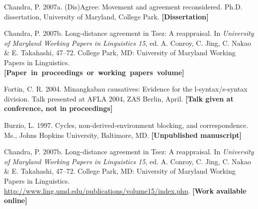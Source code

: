 \documentclass[letterpaper,12pt, twoside]{article}
\begin{document}
\begin{list}{}{\leftmargin  0.25in
               \itemindent -0.25in \itemsep 0pt \parsep 0pt }
\item
Chandra, P. 2007a. (Dis)Agree: Movement and agreement reconsidered. Ph.D. dissertation, University of Maryland, College Park. {\footnotesize\bfseries \hfill [Dissertation]}

\item
Chandra, P. 2007b. Long-distance agreement in Tsez: A reappraisal. In \emph{University of 
Maryland Working Papers in Linguistics 15}, ed. A. Conroy, C. Jing, C. Nakao \& E. 
Takahashi, 47--72. College Park, MD: University of Maryland Working Papers in Linguistics. \\
  {\footnotesize\bfseries \hspace*{238pt} \hbox{[Paper in proceedings or working papers volume]}}

\item
Fortin, C. R. 2004. Minangkabau causatives: Evidence for the l-syntax/s-syntax division. Talk presented at AFLA 2004, ZAS Berlin, April.  {\footnotesize\bfseries \hfill [Talk given at conference, not in proceedings]}

\item
Burzio, L. 1997. Cycles, non-derived-environment blocking, and correspondence. Ms., Johns Hopkins University, Baltimore, MD.  {\footnotesize\bfseries \hfill [Unpublished manuscript]}

\item
Chandra, P. 2007b. Long-distance agreement in Tsez: A reappraisal. In \emph{University of 
Maryland \linebreak[4]Working Papers in Linguistics 15}, ed. A. Conroy, C. Jing, C. Nakao \& E. 
Takahashi, 47--72. College Park, MD: University of Maryland Working Papers in Linguistics. \href{http://www.ling.umd.edu/publications/volume15/index.php}{http://www.ling.\linebreak[4]umd.edu/publications/volume15/index.php}.
  {\footnotesize\bfseries \hfill [Work available online]}


\end{list}



\insertcontact


\end{document}
